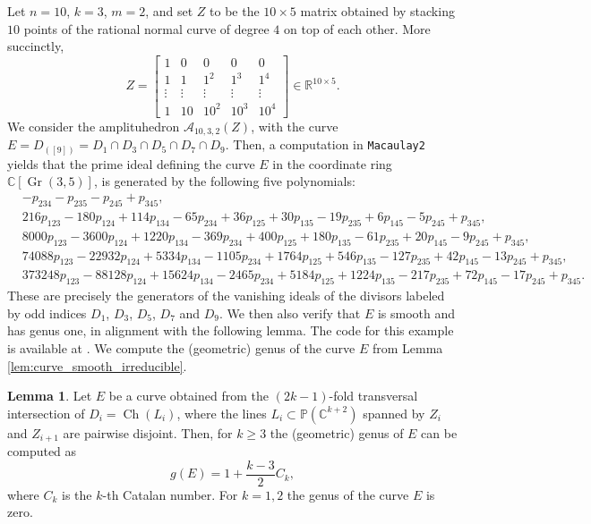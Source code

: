 \documentclass[12pt]{extarticle}
\theoremstyle{definition}
\theoremstyle{theorem}
\newtheorem{lemma}[definition]{Lemma}
\theoremstyle{remark}
\newenvironment{example}
  {\pushQED{\qed}\renewcommand{\qedsymbol}{$\diamond$}\examplex}
  {\popQED\endexamplex}
\numberwithin{equation}{section}
\newcommand{\R}{\mathbb{R}}
\newcommand{\C}{\mathbb{C}}
\newcommand{\PP}{\mathbb{P}}
\DeclareMathOperator{\gr}{Gr}
\newcommand{\aA}{\mathcal{A}}
\newcommand{\CH}{\operatorname{Ch}}
\newcommand{\odd}[1]{([#1])}
\begin{document}
\begin{example}\label{ex:A10_3_2} 
    Let $n=10$, $k=3$, $m=2$, and set $Z$ to be the $10\times 5$ matrix obtained by stacking $10$ points of the rational normal curve of degree $4$ on top of each other.
    More succinctly, 
    \[
        Z = \begin{bmatrix}
            1 & 0 & 0 & 0 & 0\\
            1 & 1 & 1^2 & 1^3 & 1^4 \\
            \vdots & \vdots & \vdots & \vdots & \vdots \\
            1 & 10 & 10^2 & 10^3 & 10^4
        \end{bmatrix}\in \R^{10\times 5}.
    \]
    We consider the amplituhedron $\aA_{10,3,2}(Z)$, with the curve $E=D_{\odd{9}}=D_1\cap D_3\cap D_5\cap D_7 \cap D_9$.
    Then, a computation in \texttt{Macaulay2} \cite{M2} yields that the prime ideal defining the curve $E$ in the coordinate ring $\C[\gr(3,5)]$, is generated by the following five polynomials:
    {\footnotesize
    \begin{align} 
        &-p_{234}-p_{235}-p_{245}+p_{345},\\
        &216p_{123} - 180p_{124} + 114p_{134} - 65p_{234} + 36p_{125} + 30p_{135} - 19p_{235} + 6p_{145} - 5p_{245} + p_{345}, \\
        &8000p_{123} - 3600p_{124} + 1220p_{134} - 369p_{234} + 400p_{125} + 180p_{135} - 61p_{235} + 20p_{145} - 9p_{245} + p_{345}, \\
        &74088p_{123} - 22932p_{124} + 5334p_{134} - 1105p_{234} + 1764p_{125} + 546p_{135} - 127p_{235} + 42p_{145} - 13p_{245} + p_{345}, \\
        &373248p_{123} - 88128p_{124} + 15624p_{134} - 2465p_{234} + 5184p_{125} + 1224p_{135} - 217p_{235} + 72p_{145} - 17p_{245} + p_{345}.
    \end{align}
    }\noindent
    These are precisely the generators of the vanishing ideals of the divisors labeled by odd indices $D_1$, $D_3$, $D_5$, $D_7$ and $D_9$.
    We then also verify that $E$ is smooth and has genus one, in alignment with the following lemma. The code for this example is available at \cite{zenodo}.
\end{example}
We compute the (geometric) genus of the curve $E$ from Lemma \ref{lem:curve_smooth_irreducible}.
\begin{lemma}\label{lem:genus_residual_curve}
    Let $E$ be a curve obtained from the $(2k-1)$-fold transversal intersection of $D_i=\CH(L_i)$, where the lines $L_i\subset \PP(\C^{k+2})$ spanned by $Z_i$ and $Z_{i+1}$ are pairwise disjoint.
    Then, for $k\geq 3$ the (geometric) genus of $E$  can be computed as 
    \[
    g(E)=1+\frac{k-3}{2}C_k,
    \]
    where $C_k$ is the $k$-th Catalan number. For $k=1,2$ the genus of the curve $E$ is zero.
\end{lemma}
\end{document}
